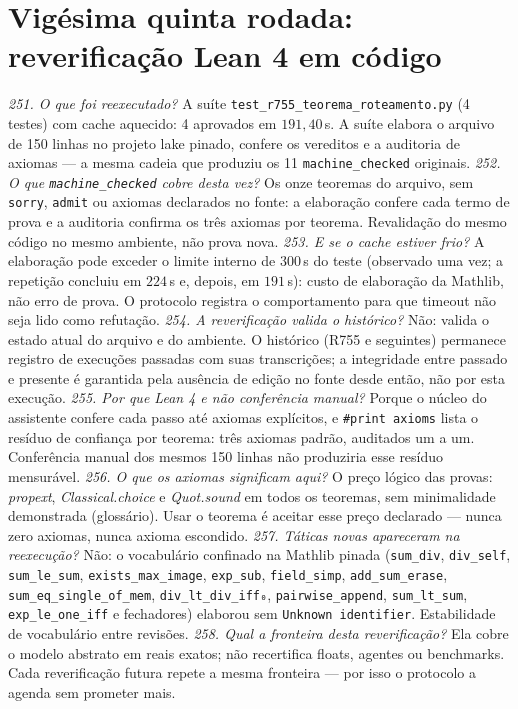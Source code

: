 \section{Vigésima quinta rodada: reverificação Lean 4 em código}
\textit{251. O que foi reexecutado?} A suíte \texttt{test\_r755\_teorema\_roteamento.py} (4 testes) com cache aquecido: 4 aprovados em $191{,}40$\,s. A suíte elabora o arquivo de 150 linhas no projeto lake pinado, confere os vereditos e a auditoria de axiomas --- a mesma cadeia que produziu os 11 \texttt{machine\_checked} originais.
\textit{252. O que \texttt{machine\_checked} cobre desta vez?} Os onze teoremas do arquivo, sem \texttt{sorry}, \texttt{admit} ou axiomas declarados no fonte: a elaboração confere cada termo de prova e a auditoria confirma os três axiomas por teorema. Revalidação do mesmo código no mesmo ambiente, não prova nova.
\textit{253. E se o cache estiver frio?} A elaboração pode exceder o limite interno de 300\,s do teste (observado uma vez; a repetição concluiu em $224$\,s e, depois, em $191$\,s): custo de elaboração da Mathlib, não erro de prova. O protocolo registra o comportamento para que timeout não seja lido como refutação.
\textit{254. A reverificação valida o histórico?} Não: valida o estado atual do arquivo e do ambiente. O histórico (R755 e seguintes) permanece registro de execuções passadas com suas transcrições; a integridade entre passado e presente é garantida pela ausência de edição no fonte desde então, não por esta execução.
\textit{255. Por que Lean 4 e não conferência manual?} Porque o núcleo do assistente confere cada passo até axiomas explícitos, e \texttt{\#print axioms} lista o resíduo de confiança por teorema: três axiomas padrão, auditados um a um. Conferência manual dos mesmos 150 linhas não produziria esse resíduo mensurável.
\textit{256. O que os axiomas significam aqui?} O preço lógico das provas: \textit{propext}, \textit{Classical.choice} e \textit{Quot.sound} em todos os teoremas, sem minimalidade demonstrada (glossário). Usar o teorema é aceitar esse preço declarado --- nunca zero axiomas, nunca axioma escondido.
\textit{257. Táticas novas apareceram na reexecução?} Não: o vocabulário confinado na Mathlib pinada (\texttt{sum\_div}, \texttt{div\_self}, \texttt{sum\_le\_sum}, \texttt{exists\_max\_image}, \texttt{exp\_sub}, \texttt{field\_simp}, \texttt{add\_sum\_erase}, \texttt{sum\_eq\_single\_of\_mem}, \texttt{div\_lt\_div\_iff₀}, \texttt{pairwise\_append}, \texttt{sum\_lt\_sum}, \texttt{exp\_le\_one\_iff} e fechadores) elaborou sem \texttt{Unknown identifier}. Estabilidade de vocabulário entre revisões.
\textit{258. Qual a fronteira desta reverificação?} Ela cobre o modelo abstrato em reais exatos; não recertifica floats, agentes ou benchmarks. Cada reverificação futura repete a mesma fronteira --- por isso o protocolo a agenda sem prometer mais.
